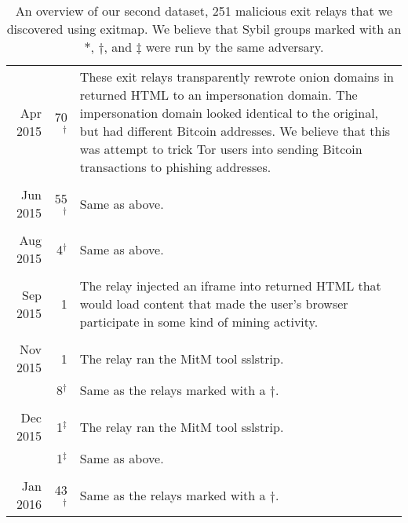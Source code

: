 \begin{table*}
\begin{tabularx}{\textwidth}{r r X}
Apr 2015 & 70$^\dagger$ & These exit relays transparently rewrote onion domains
in returned HTML to an impersonation domain.  The impersonation domain looked
identical to the original, but had different Bitcoin addresses.  We believe that
this was attempt to trick Tor users into sending Bitcoin transactions to
phishing addresses. \\

& & \\

Jun 2015 & 55$^\dagger$ & Same as above. \\

& & \\

Aug 2015 & 4$^\dagger$ & Same as above. \\

& & \\

Sep 2015 & 1 & The relay injected an iframe into returned HTML that would load
content that made the user's browser participate in some kind of mining
activity. \\

& & \\

Nov 2015 & 1 & The relay ran the MitM tool sslstrip. \\

& 8$^\dagger$ & Same as the relays marked with a $\dagger$. \\

& & \\

Dec 2015 & 1$^\ddagger$ & The relay ran the MitM tool sslstrip. \\

& 1$^\ddagger$ & Same as above. \\

& & \\

Jan 2016 & 43$^\dagger$ & Same as the relays marked with a $\dagger$. \\
\bottomrule
\end{tabularx}
\caption{An overview of our second dataset, 251 malicious exit relays that we
discovered using exitmap.  We believe that Sybil groups marked with an
$*$, $\dagger$, and $\ddagger$ were run by the same adversary.}
\label{tab:exitmap-dataset}
\end{table*}
